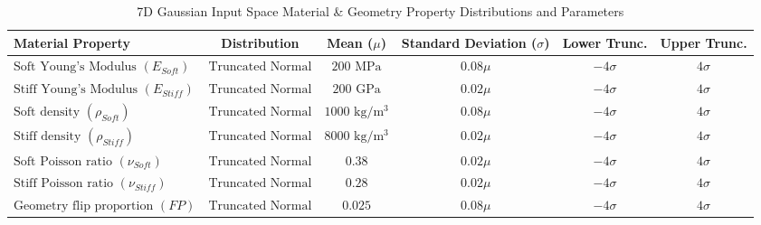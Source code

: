 \documentclass[preprint,review,12pt]{elsarticle}
\begin{document}
\begin{table}[H]
\centering
\tiny
\caption{7D Gaussian Input Space Material \& Geometry Property Distributions and Parameters}
\label{7D_Gaussian_Input_Table}
\begin{tabularx}{\linewidth}{Xccccc} 
\toprule
Material Property & Distribution & Mean ($\mu$) & Standard Deviation ($\sigma$) & Lower Trunc. & Upper Trunc. \\
\midrule
\( \text{Soft Young's Modulus } (E_{Soft})\) & \( \text{Truncated Normal} \) & \( 200 \text{ MPa} \) & \( 0.08\mu \) & \( -4\sigma \) & \( 4\sigma \) \\
\( \text{Stiff Young's Modulus } (E_{Stiff})\) & \( \text{Truncated Normal} \) & \( 200 \text{ GPa} \) & \( 0.02\mu \) & \( -4\sigma \) & \( 4\sigma \) \\
\( \text{Soft density } (\rho_{Soft})\) & \( \text{Truncated Normal} \) & \( 1000 \text{ kg/m$^3$} \) & \( 0.08\mu \) & \( -4\sigma \) & \( 4\sigma \) \\
\( \text{Stiff density } (\rho_{Stiff})\) & \( \text{Truncated Normal} \) & \( 8000 \text{ kg/m$^3$} \) & \( 0.02\mu \) & \( -4\sigma \) & \( 4\sigma \) \\
\( \text{Soft Poisson ratio } (\nu_{Soft})\) & \( \text{Truncated Normal} \) & \( 0.38 \) & \( 0.02\mu \) & \( -4\sigma \) & \( 4\sigma \) \\
\( \text{Stiff Poisson ratio } (\nu_{Stiff})\) & \( \text{Truncated Normal} \) & \( 0.28 \) & \( 0.02\mu \) & \( -4\sigma \) & \( 4\sigma \) \\
\( \text{Geometry flip proportion }  (FP)\) & \( \text{Truncated Normal} \) & \( 0.025 \) & \( 0.08\mu \) & \( -4\sigma \) & \( 4\sigma \) \\
\bottomrule
\end{tabularx}
\end{table}

\end{document}
